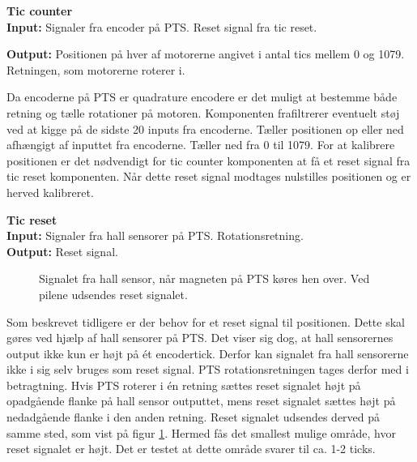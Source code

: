 
\textbf{Tic counter}\\
\textbf{Input:}
Signaler fra encoder på PTS. Reset signal fra tic reset.

\textbf{Output:} Positionen på hver af motorerne angivet i antal tics mellem 0 
og 1079. Retningen, som motorerne roterer i. 

Da encoderne på PTS er quadrature encodere er det muligt at bestemme både retning og 
tælle rotationer på motoren.
Komponenten frafiltrerer eventuelt støj ved at kigge på de sidste 20 inputs fra encoderne.
Tæller positionen op eller ned afhængigt af inputtet fra encoderne. 
Tæller ned fra 0 til 1079.
For at kalibrere positionen er det nødvendigt for tic counter komponenten at få 
et reset signal fra tic reset komponenten. 
Når dette reset signal modtages nulstilles positionen og er herved kalibreret.

\textbf{Tic reset}\\
\textbf{Input:} Signaler fra hall sensorer på PTS. Rotationsretning.\\
\textbf{Output:} Reset signal.

\begin{figure}[!th]
\centering

\caption[Signal fra hall sensor]{Signalet fra hall sensor, når magneten på PTS køres hen over. Ved pilene udsendes reset signalet.}
\label{fig:hall_sensor_signal}
\end{figure}

Som beskrevet tidligere er der behov for et reset signal til positionen. 
Dette skal gøres ved hjælp af hall sensorer på PTS. 
Det viser sig dog, at hall sensorernes output ikke kun er højt på ét encodertick. 
Derfor kan signalet fra hall sensorerne ikke i sig selv bruges som reset signal.
PTS rotationsretningen tages derfor med i betragtning.
Hvis PTS roterer i én retning sættes reset signalet højt på opadgående 
flanke på hall sensor outputtet, mens reset signalet sættes højt på nedadgående 
flanke i den anden retning. Reset signalet udsendes derved på samme sted, som vist på figur \ref{fig:hall_sensor_signal}.
Hermed fås det smallest mulige område, hvor reset signalet er højt.
Det er testet at dette område svarer til ca. 1-2 ticks.

